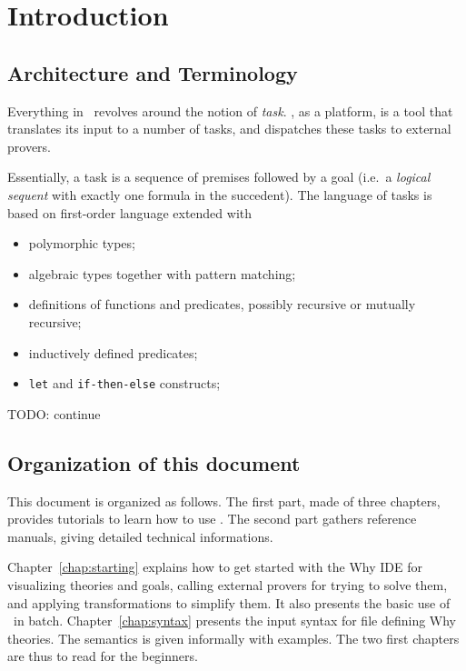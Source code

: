 
\chapter{Introduction}

\section{Architecture and Terminology}

Everything in \why\ revolves around the notion of
\emph{task}.  \why, as a platform, is a tool that
translates its input to a number of tasks, and dispatches these tasks
to external provers. 

Essentially, a task is a sequence of premises followed by a goal
(i.e.~a \emph{logical sequent} with exactly one formula in the
succedent). The language of tasks is based on first-order language
extended with 
\begin{itemize}
\item polymorphic types;
\item algebraic types together with pattern matching;
\item definitions of functions and predicates, possibly recursive or
  mutually recursive;
\item inductively defined predicates;
\item \texttt{let} and \texttt{if-then-else} constructs;
\end{itemize}

TODO: continue

\section{Organization of this document}

This document is organized as follows. The first part, made of three chapters, provides tutorials to learn how to use \why. The second part gathers reference
manuals, giving detailed technical informations.

Chapter~\ref{chap:starting} explains how to get started with the Why
IDE for visualizing theories and goals, calling external provers for
trying to solve them, and applying transformations to simplify
them. It also presents the basic use of \why\ in
batch. Chapter~\ref{chap:syntax} presents the input syntax for file
defining Why theories. The semantics is given informally with
examples.  The two first chapters are thus to read for the beginners.

